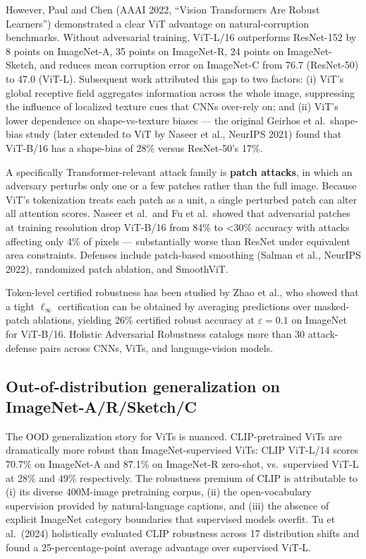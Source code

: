 \documentclass{article}
\begin{document}
However, Paul and Chen (AAAI 2022, ``Vision Transformers Are Robust Learners'') demonstrated a clear ViT advantage on natural-corruption benchmarks. Without adversarial training, ViT-L/16 outperforms ResNet-152 by 8 points on ImageNet-A, 35 points on ImageNet-R, 24 points on ImageNet-Sketch, and reduces mean corruption error on ImageNet-C from 76.7 (ResNet-50) to 47.0 (ViT-L). Subsequent work attributed this gap to two factors: (i) ViT's global receptive field aggregates information across the whole image, suppressing the influence of localized texture cues that CNNs over-rely on; and (ii) ViT's lower dependence on shape-vs-texture biases --- the original Geirhos et al.~shape-bias study (later extended to ViT by Naseer et al., NeurIPS 2021) found that ViT-B/16 has a shape-bias of 28\% versus ResNet-50's 17\%.

A specifically Transformer-relevant attack family is \textbf{patch attacks}, in which an adversary perturbs only one or a few patches rather than the full image. Because ViT's tokenization treats each patch as a unit, a single perturbed patch can alter all attention scores. Naseer et al.~and Fu et al.~showed that adversarial patches at training resolution drop ViT-B/16 from 84\% to \textless30\% accuracy with attacks affecting only 4\% of pixels --- substantially worse than ResNet under equivalent area constraints. Defenses include patch-based smoothing (Salman et al., NeurIPS 2022), randomized patch ablation, and SmoothViT.

Token-level certified robustness has been studied by Zhao et al., who showed that a tight \(\ell_\infty\) certification can be obtained by averaging predictions over masked-patch ablations, yielding 26\% certified robust accuracy at \(\varepsilon = 0.1\) on ImageNet for ViT-B/16. Holistic Adversarial Robustness \citep{chen2022mobileformerbridgi} catalogs more than 30 attack-defense pairs across CNNs, ViTs, and language-vision models.

\subsection{Out-of-distribution generalization on ImageNet-A/R/Sketch/C}\label{out-of-distribution-generalization-on-imagenet-arsketchc}

The OOD generalization story for ViTs is nuanced. CLIP-pretrained ViTs are dramatically more robust than ImageNet-supervised ViTs: CLIP ViT-L/14 scores 70.7\% on ImageNet-A and 87.1\% on ImageNet-R zero-shot, vs.~supervised ViT-L at 28\% and 49\% respectively. The robustness premium of CLIP is attributable to (i) its diverse 400M-image pretraining corpus, (ii) the open-vocabulary supervision provided by natural-language captions, and (iii) the absence of explicit ImageNet category boundaries that supervised models overfit. Tu et al.~(2024) holistically evaluated CLIP robustness across 17 distribution shifts and found a 25-percentage-point average advantage over supervised ViT-L.
\end{document}
